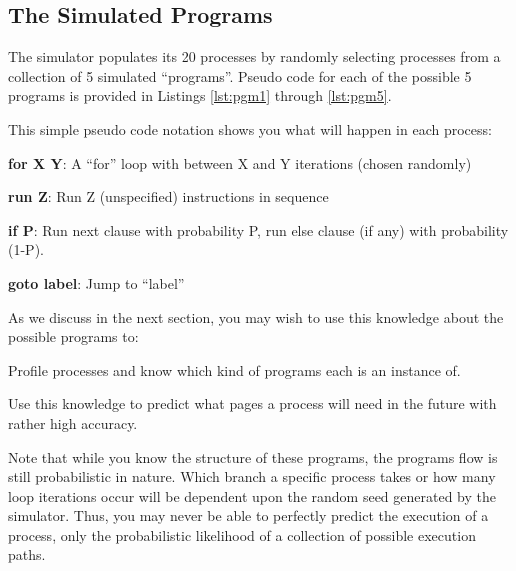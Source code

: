 \documentclass[12pt]{article}
\newenvironment{packed_enum}{
\begin{enumerate}
  \setlength{\itemsep}{1pt}
  \setlength{\parskip}{0pt}
  \setlength{\parsep}{0pt}
}{\end{enumerate}}
\newenvironment{packed_item}{
\begin{itemize}
  \setlength{\itemsep}{1pt}
  \setlength{\parskip}{0pt}
  \setlength{\parsep}{0pt}
}{\end{itemize}}
\begin{document}
\subsection {The Simulated Programs}

The simulator populates its 20 processes by randomly selecting processes
from a collection of 5 simulated ``programs''. Pseudo code for each of
the possible 5 programs is provided in Listings \ref{lst:pgm1} through
\ref{lst:pgm5}.
\clearpage










This simple pseudo code notation shows you what will happen in each
process:
\begin{packed_item}
\item {\bf for X Y}: A ``for'' loop with between X and Y iterations
  (chosen randomly)
\item {\bf run Z}: Run Z (unspecified) instructions in sequence
\item {\bf if P}: Run next clause with probability P,
  run else clause (if any) with probability (1-P).
\item {\bf goto label}: Jump to ``label''
\end{packed_item}

As we discuss in the next section,
you may wish to use this knowledge about the possible programs to:
\begin{packed_enum}
\item Profile processes and know which kind of programs each is an
  instance of.
\item Use this knowledge to predict what pages a process will need
  in the future with rather high accuracy.
\end{packed_enum}

Note that while you know the structure of these programs, the programs
flow is still probabilistic in nature. Which branch a specific process
takes or how many loop iterations occur will be dependent upon the
random seed generated by the simulator. Thus, you may never be able to
perfectly predict the execution of a process, only the probabilistic
likelihood of a collection of possible execution paths.
\end{document}
